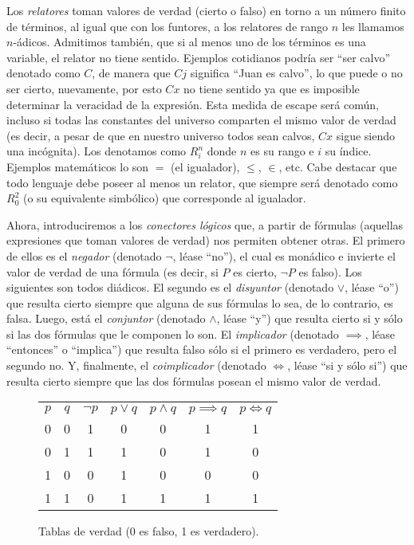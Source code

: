 \documentclass[11pt,a4paper]{book}
\begin{document}
Los \textit{relatores} toman valores de verdad (cierto o falso) en torno a un número finito de términos, al igual que con los funtores, a los relatores de rango $n$ les llamamos $n$-ádicos. Admitimos también, que si al menos uno de los términos es una variable, el relator no tiene sentido. Ejemplos cotidianos podría ser ``ser calvo'' denotado como $C$, de manera que $Cj$ significa ``Juan es calvo'', lo que puede o no ser cierto, nuevamente, por esto $Cx$ no tiene sentido ya que es imposible determinar la veracidad de la expresión. Esta medida de escape será común, incluso si todas las constantes del universo comparten el mismo valor de verdad (es decir, a pesar de que en nuestro universo todos sean calvos, $Cx$ sigue siendo una incógnita). Los denotamos como $R^n_i$ donde $n$ es su rango e $i$ su índice. Ejemplos matemáticos lo son $=$ (el igualador), $\leq$, $\in$, etc. Cabe destacar que todo lenguaje debe poseer al menos un relator, que siempre será denotado como $R^2_0$ (o su equivalente simbólico) que corresponde al igualador.

Ahora, introduciremos a los \textit{conectores lógicos} que, a partir de fórmulas (aquellas expresiones que toman valores de verdad) nos permiten obtener otras. El primero de ellos es el \textit{negador} (denotado $\neg$, léase ``no''), el cual es monádico e invierte el valor de verdad de una fórmula (es decir, si $P$ es cierto, $\neg P$ es falso). Los siguientes son todos diádicos. El segundo es el \textit{disyuntor} (denotado $\vee$, léase ``o'') que resulta cierto siempre que alguna de sus fórmulas lo sea, de lo contrario, es falsa. Luego, está el \textit{conjuntor} (denotado $\wedge$, léase ``y'') que resulta cierto si y sólo si las dos fórmulas que le componen lo son. El \textit{implicador} (denotado $\implies$, léase ``entonces'' o ``implica'') que resulta falso sólo si el primero es verdadero, pero el segundo no. Y, finalmente, el \textit{coimplicador} (denotado $\iff$, léase ``si y sólo si'') que resulta cierto siempre que las dos fórmulas posean el mismo valor de verdad.
\begin{figure}
	\centering
	\begin{tabular}{cc||c|c|c|c|c}
		$p$ & $q$ & $\neg p$ & $p\vee q$ & $p\wedge q$ & $p\implies q$ & $p\iff q$ \\
		0 & 0 & 1 & 0 & 0 & 1 & 1 \\
		0 & 1 & 1 & 1 & 0 & 1 & 0 \\
		1 & 0 & 0 & 1 & 0 & 0 & 0 \\
		1 & 1 & 0 & 1 & 1 & 1 & 1
	\end{tabular}
	\caption{Tablas de verdad (0 es falso, 1 es verdadero).}
\end{figure}
\end{document}
